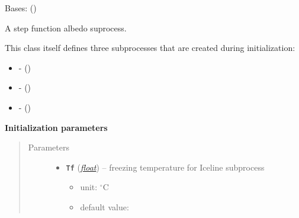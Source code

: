 \documentclass[a4paper,10pt,english]{sphinxmanual}
\begin{document}

\begin{fulllineitems}
\label{api/climlab.surface:climlab.surface.albedo.StepFunctionAlbedo}
Bases: {\hyperref[api/climlab.process:climlab.process.diagnostic.DiagnosticProcess]{\emph{}}} ()

A step function albedo suprocess.

This class itself defines three subprocesses that are created during 
initialization:
\begin{itemize}
\item {} 
 - {\hyperref[api/climlab.surface:climlab.surface.albedo.Iceline]{\emph{}}} ()

\item {} 
 - {\hyperref[api/climlab.surface:climlab.surface.albedo.P2Albedo]{\emph{}}} ()

\item {} 
 - {\hyperref[api/climlab.surface:climlab.surface.albedo.ConstantAlbedo]{\emph{}}} ()

\end{itemize}

\textbf{Initialization parameters}
\begin{quote}\begin{description}
\item[{Parameters}] \leavevmode\begin{itemize}
\item {} 
\textbf{\texttt{Tf}} (\href{http://docs.python.org/2.7/library/functions.html\#float}{\emph{float}}) -- 
freezing temperature for Iceline subprocess
\begin{itemize}
\item {} 
unit: \(^{\circ} \textrm{C}\)

\item {} 
default value: 


\end{itemize}
\end{itemize}
\end{description}
\end{quote}
\end{fulllineitems}
\end{document}
